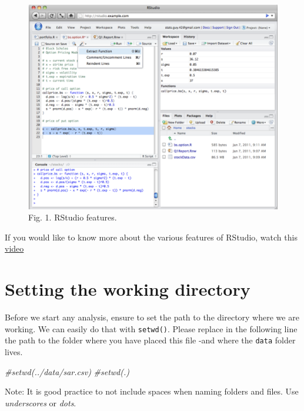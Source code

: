 \documentclass[
]{book}
\newenvironment{Shaded}{\begin{snugshade}}{\end{snugshade}}
\newcommand{\CommentTok}[1]{\textcolor[rgb]{0.56,0.35,0.01}{\textit{#1}}}
\begin{document}
\begin{figure}
\centering
\includegraphics{figs/ch2/rstudio_features.png}
\caption{Fig. 1. RStudio features.}
\end{figure}

If you would like to know more about the various features of RStudio, watch this \href{https://rstudio.com/products/rstudio/}{video}

\hypertarget{setting-the-working-directory}{%
\section{Setting the working directory}\label{setting-the-working-directory}}

Before we start any analysis, ensure to set the path to the directory where we are working. We can easily do that with \texttt{setwd()}. Please replace in the following line the path to the folder where you have placed this file -and where the \texttt{data} folder lives.

\begin{Shaded}
\begin{Highlighting}[]
\CommentTok{\#setwd(\textquotesingle{}../data/sar.csv\textquotesingle{})}
\CommentTok{\#setwd(\textquotesingle{}.\textquotesingle{})}
\end{Highlighting}
\end{Shaded}

Note: It is good practice to not include spaces when naming folders and files. Use \emph{underscores} or \emph{dots}.
\end{document}
